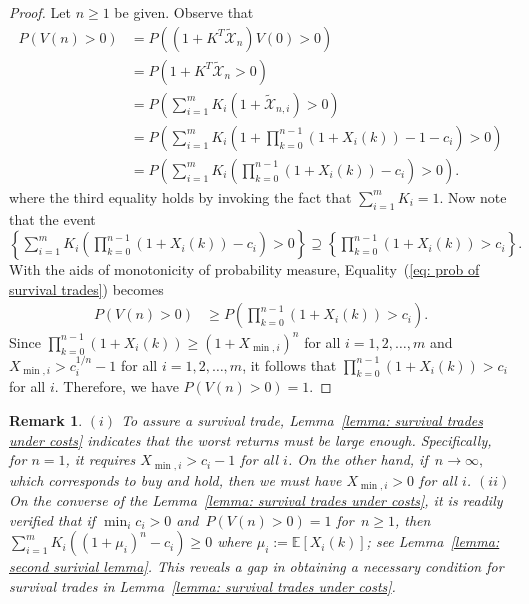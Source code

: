 \documentclass[10pt]{article} %
\newtheorem{remark}{Remark}[section]
\begin{document}
	\begin{proof} 
		Let $n\geq 1$ be given.
		Observe that
		\begin{align}
			P(V(n) > 0)  
			&=  P( (1+K^T \widetilde{\mathcal{X}}_n)V(0)>0) \nonumber \\
			&=  P( 1+K^T \widetilde{\mathcal{X}}_n>0) \nonumber \\
			&=  P\left( \sum_{i=1}^m K_i( 1+  \widetilde{\mathcal{X}}_{n,i}) >0 \right)\nonumber \\
			&=  P\left( \sum_{i=1}^m K_i\left( 1+  \prod_{k=0}^{n-1} (1+ X_i(k))  - 1 - c_i \right) >0 \right)\nonumber \\
			&=  P\left( \sum_{i=1}^m K_i\left(   \prod_{k=0}^{n-1} (1+ X_i(k))  - c_i \right) >0 \right).  \label{eq: prob of survival trades}
		\end{align}
		where the third equality holds by invoking the fact that $\sum_{i=1}^m K_i = 1.$
		Now note that the event
		$
		\left\{ \sum_{i=1}^m K_i\left(   \prod_{k=0}^{n-1} (1+ X_i(k))  - c_i  \right) >0 \right\} \supseteq \left\{  \prod_{k=0}^{n-1} (1+ X_i(k))  >  c_i  \right\}.
		$
		With the aids of monotonicity of probability measure,  Equality~(\ref{eq: prob of survival trades}) becomes
		\begin{align*}
			P(V(n) > 0)  
			&\geq P\left( \prod_{k=0}^{n-1} (1+ X_i(k))  > c_i   \right).
		\end{align*}
		Since $\prod_{k=0}^{n-1} (1+X_i(k)) \geq (1+X_{\min,i})^n$ for all $i=1,2,\dots,m$ and ${X}_{\min,i} > c_i^{1/n}-1$ for all $i=1,2,\dots,m$, it follows that
		$
		\prod_{k=0}^{n-1} (1+X_i(k)) > c_i
		$ for all $i$.
		Therefore, we have
		$
		P(V(n)>0) = 1.
		$
	\end{proof}
	
	\begin{remark}\rm
		$(i)$  To assure a survival trade,  Lemma~\ref{lemma: survival trades under costs} indicates that the worst returns must be large enough. 
		Specifically, for $n =1$, it requires $X_{\min,i} > c_i -1$ for all $i$. On the other hand, if~$n \to \infty,$ which corresponds to buy and hold, then we must have $X_{\min, i} > 0$ for all $i$.  
		$(ii)$ On the converse of the Lemma~\ref{lemma: survival trades under costs}, it is readily verified that if $\min_i c_i>0$ and~$P(V(n)>0) = 1$ for~$n \geq 1$, then  $\sum_{i=1}^m K_i ((1+ \mu_i)^n - c_i) \geq 0$ where $\mu_i := \mathbb{E}[X_i(k)]$; see Lemma~\ref{lemma: second surivial lemma}. 
		This reveals a gap in obtaining a necessary condition for survival trades in Lemma~\ref{lemma: survival trades under costs}.
	\end{remark}
	
\end{document}

